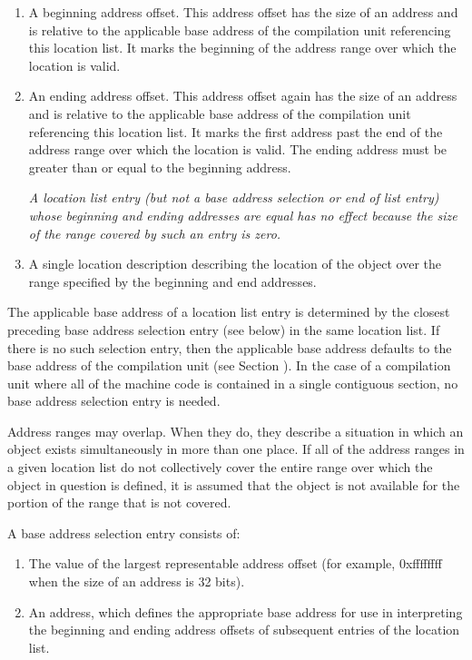 \begin{enumerate}[1]
\item A beginning address offset. 
This address offset has the size of an address and is
relative to the applicable base address of the compilation
unit referencing this location list. It marks the beginning
of the address range over which the location is valid.

\item An ending address offset.  This address offset again
has the size of an address and is relative to the applicable
base address of the compilation unit referencing this location
list. It marks the first address past the end of the address
range over which the location is valid. The ending address
must be greater than or equal to the beginning address.

\textit{A location list entry (but not a base address selection or end of list entry) whose beginning
and ending addresses are equal has no effect because the size of the range covered by such
an entry is zero.}

\item A single location description 
describing the location of the object over the range specified by
the beginning and end addresses.
\end{enumerate}

The applicable base address of a location list entry is
determined by the closest preceding base address selection
entry (see below) in the same location list. If there is
no such selection entry, then the applicable base address
defaults to the base address of the compilation unit (see
Section ).  
In the case of a compilation unit where all of
the machine code is contained in a single contiguous section,
no base address selection entry is needed.

Address ranges may overlap. When they do, they describe a
situation in which an object exists simultaneously in more than
one place. If all of the address ranges in a given location
list do not collectively cover the entire range over which the
object in question is defined, it is assumed that the object is
not available for the portion of the range that is not covered.

A base address selection entry consists of:
\begin{enumerate}[1]
\item The value of the largest representable 
address offset (for example, 0xffffffff when the size of
an address is 32 bits).
\item An address, which defines the 
appropriate base address for use in interpreting the beginning
and ending address offsets of subsequent entries of the location list.
\end{enumerate}


